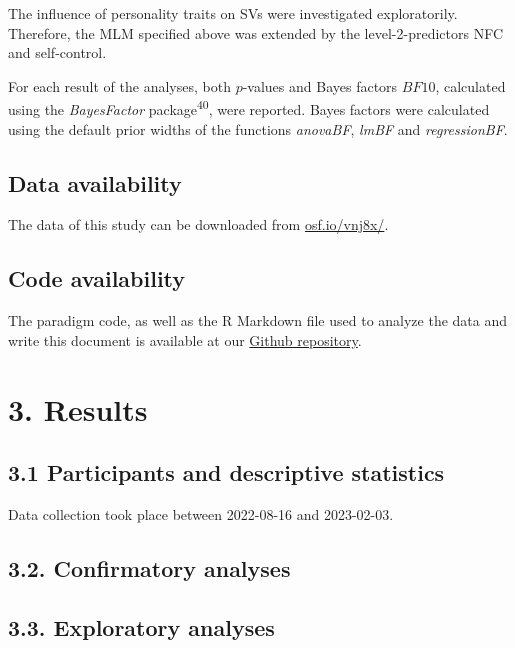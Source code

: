 \documentclass[
  man,floatsintext]{apa6}
\begin{document}
The influence of personality traits on SVs were investigated exploratorily.
Therefore, the MLM specified above was extended by the level-2-predictors NFC and self-control.

For each result of the analyses, both \(p\)-values and Bayes factors \(BF10\), calculated using the \emph{BayesFactor} package\textsuperscript{40}, were reported.
Bayes factors were calculated using the default prior widths of the functions \emph{anovaBF}, \emph{lmBF} and \emph{regressionBF}.

\hypertarget{data-availability}{%
\subsection{Data availability}\label{data-availability}}

The data of this study can be downloaded from \href{https://osf.io/vnj8x/}{osf.io/vnj8x/}.

\hypertarget{code-availability}{%
\subsection{Code availability}\label{code-availability}}

The paradigm code, as well as the R Markdown file used to analyze the data and write this document is available at our \href{https://github.com/ChScheffel/CAD}{Github repository}.

\hypertarget{results}{%
\section{3. Results}\label{results}}

\hypertarget{participants-and-descriptive-statistics}{%
\subsection{3.1 Participants and descriptive statistics}\label{participants-and-descriptive-statistics}}

Data collection took place between 2022-08-16 and 2023-02-03.

\hypertarget{confirmatory-analyses}{%
\subsection{3.2. Confirmatory analyses}\label{confirmatory-analyses}}

\hypertarget{exploratory-analyses}{%
\subsection{3.3. Exploratory analyses}\label{exploratory-analyses}}
\end{document}
